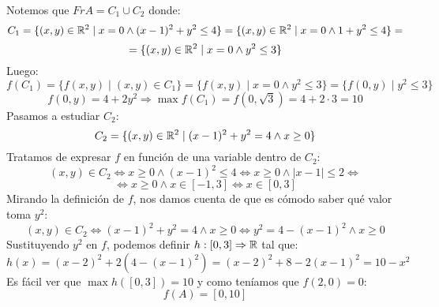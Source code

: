 \noindent
Notemos que $FrA = C_1 \cup C_2$ donde:
$$C_1 = \{(x,y) \in \mathbb R^2 \mid x = 0 \land (x-1)^2 + y^2 \leq 4\} = \{(x,y) \in \mathbb R^2 \mid x=0 \land 1 + y^2 \leq 4\} =$$ $$=\{(x,y) \in \mathbb R^2 \mid x=0 \land y^2 \leq 3\}$$
Luego:
$$f(C_1) = \{f(x,y) \mid (x,y) \in C_1\} = \{f(x,y) \mid x = 0 \land y^2 \leq 3\} = \{f(0,y) \mid y^2 \leq 3\}$$
$$f(0,y) = 4+2y^2 \Rightarrow \max f(C_1) = f(0,\sqrt{3}) = 4+2 \cdot 3 = 10$$
Pasamos a estudiar $C_2$:
$$C_2 = \{(x,y) \in \mathbb R^2 \mid (x-1)^2 + y^2 = 4 \land x \geq 0\}$$
Tratamos de expresar $f$ en función de una variable dentro de $C_2$:
$$(x,y) \in C_2 \Leftrightarrow x \geq 0 \land (x-1)^2 \leq 4 \Leftrightarrow x \geq 0 \land |x-1|\leq 2 \Leftrightarrow$$
$$\Leftrightarrow x \geq 0 \land x \in [-1,3] \Leftrightarrow x \in [0,3]$$
Mirando la definición de $f$, nos damos cuenta de que es cómodo saber qué valor toma $y^2$:
$$(x,y) \in C_2 \Leftrightarrow (x-1)^2 + y^2 = 4 \land x \geq 0 \Leftrightarrow y^2 = 4-(x-1)^2 \land x \geq 0$$
Sustituyendo $y^2$ en $f$, podemos definir $h:[0,3] \Rightarrow \mathbb R$ tal que:
$$h(x) = (x-2)^2 + 2(4-(x-1)^2) = (x-2)^2 + 8 - 2(x-1)^2 = 10 - x^2$$
Es fácil ver que $\max h([0,3]) = 10$ y como teníamos que $f(2,0) = 0$:
$$f(A) = [0,10]$$
